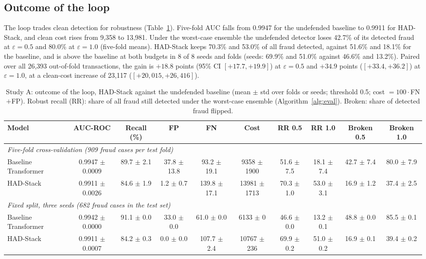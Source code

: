 \documentclass[conference]{IEEEtran}
\begin{document}
\subsection{Outcome of the loop}\label{sec:outA}
The loop trades clean detection for robustness (Table~\ref{tab:outcome}). Five-fold AUC falls from 0.9947 for the undefended baseline to 0.9911 for HAD-Stack, and clean cost rises from 9,358 to 13,981. Under the worst-case ensemble the undefended detector loses 42.7\% of its detected fraud at $\varepsilon{=}0.5$ and 80.0\% at $\varepsilon{=}1.0$ (five-fold means). HAD-Stack keeps 70.3\% and 53.0\% of all fraud detected, against 51.6\% and 18.1\% for the baseline, and is above the baseline at both budgets in 8 of 8 seeds and folds (seeds: 69.9\% and 51.0\% against 46.6\% and 13.2\%). Paired over all 26,393 out-of-fold transactions, the gain is $+18.8$ points (95\% CI $[+17.7,+19.9]$) at $\varepsilon{=}0.5$ and $+34.9$ points ($[+33.4,+36.2]$) at $\varepsilon{=}1.0$, at a clean-cost increase of 23,117 ($[+20{,}015,+26{,}416]$).

\begin{table}[t]
\centering
\caption{Study A: outcome of the loop, HAD-Stack against the undefended baseline (mean $\pm$ std over folds or seeds; threshold 0.5; cost $=100\cdot$FN$+$FP). Robust recall (RR): share of all fraud still detected under the worst-case ensemble (Algorithm~\ref{alg:eval}). Broken: share of detected fraud flipped.}
\label{tab:outcome}
\footnotesize
\setlength{\tabcolsep}{3pt}
\begin{tabular}{lccccccccc}
\toprule
Model & AUC-ROC & Recall (\%) & FP & FN & Cost & RR 0.5 & RR 1.0 & Broken 0.5 & Broken 1.0\\
\midrule
\multicolumn{10}{l}{\emph{Five-fold cross-validation (909 fraud cases per test fold)}}\\
Baseline Transformer & 0.9947 $\pm$ 0.0009 & 89.7 $\pm$ 2.1 & 37.8 $\pm$ 13.8 & 93.2 $\pm$ 19.1 & 9358 $\pm$ 1900 & 51.6 $\pm$ 7.5 & 18.1 $\pm$ 7.4 & 42.7 $\pm$ 7.4 & 80.0 $\pm$ 7.9\\
HAD-Stack & 0.9911 $\pm$ 0.0026 & 84.6 $\pm$ 1.9 & 1.2 $\pm$ 0.7 & 139.8 $\pm$ 17.1 & 13981 $\pm$ 1713 & 70.3 $\pm$ 1.0 & 53.0 $\pm$ 3.1 & 16.9 $\pm$ 1.2 & 37.4 $\pm$ 2.5\\
\midrule
\multicolumn{10}{l}{\emph{Fixed split, three seeds (682 fraud cases in the test set)}}\\
Baseline Transformer & 0.9942 $\pm$ 0.0000 & 91.1 $\pm$ 0.0 & 33.0 $\pm$ 0.0 & 61.0 $\pm$ 0.0 & 6133 $\pm$ 0 & 46.6 $\pm$ 0.0 & 13.2 $\pm$ 0.1 & 48.8 $\pm$ 0.0 & 85.5 $\pm$ 0.1\\
HAD-Stack & 0.9911 $\pm$ 0.0007 & 84.2 $\pm$ 0.3 & 0.0 $\pm$ 0.0 & 107.7 $\pm$ 2.4 & 10767 $\pm$ 236 & 69.9 $\pm$ 0.2 & 51.0 $\pm$ 0.2 & 16.9 $\pm$ 0.1 & 39.4 $\pm$ 0.2\\
\bottomrule
\end{tabular}
\end{table}
\end{document}
